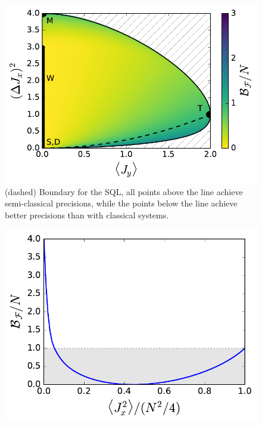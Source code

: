 \begin{figure}
  \centering
  \includegraphics[scale=.65]{img/plots/LT_spsq2d_4.pdf}
  \caption{(dashed) Boundary for the SQL, all points above the line achieve semi-classical precisions, while the points below the line achieve better precisions than with classical systems.}
  \label{fig:vd-secuence-evo}
\end{figure}

\begin{figure}
  \centering
  \includegraphics[scale=.65]{img/plots/LT_dicke_edge.pdf}
  \caption{}
  \label{fig:vd-secuence-evo}
\end{figure}

